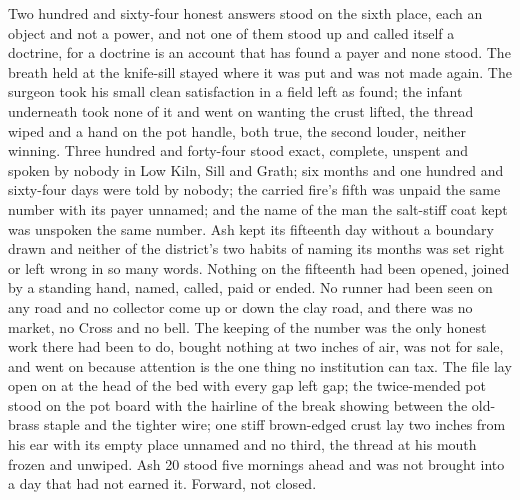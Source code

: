 Two hundred and sixty-four honest answers stood on the sixth place, each an object and not a power, and not one of them stood up and called itself a doctrine, for a doctrine is an account that has found a payer and none stood. The breath held at the knife-sill stayed where it was put and was not made again. The surgeon took his small clean satisfaction in a field left as found; the infant underneath took none of it and went on wanting the crust lifted, the thread wiped and a hand on the pot handle, both true, the second louder, neither winning. Three hundred and forty-four stood exact, complete, unspent and spoken by nobody in Low Kiln, Sill and Grath; six months and one hundred and sixty-four days were told by nobody; the carried fire's fifth was unpaid the same number with its payer unnamed; and the name of the man the salt-stiff coat kept was unspoken the same number. Ash kept its fifteenth day without a boundary drawn and neither of the district's two habits of naming its months was set right or left wrong in so many words. Nothing on the fifteenth had been opened, joined by a standing hand, named, called, paid or ended. No runner had been seen on any road and no collector come up or down the clay road, and there was no market, no Cross and no bell. The keeping of the number was the only honest work there had been to do, bought nothing at two inches of air, was not for sale, and went on because attention is the one thing no institution can tax. The file lay open on  at the head of the bed with every gap left gap; the twice-mended pot stood on the pot board with the hairline of the break showing between the old-brass staple and the tighter wire; one stiff brown-edged crust lay two inches from his ear with its empty place unnamed and no third, the thread at his mouth frozen and unwiped. Ash 20 stood five mornings ahead and was not brought into a day that had not earned it. Forward, not closed.
